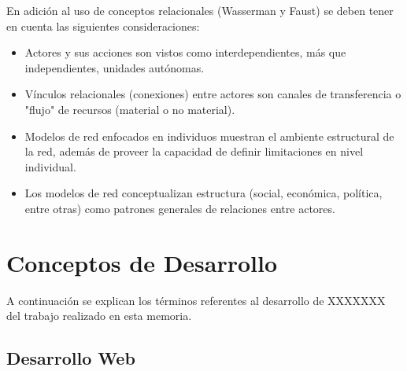 En adición al uso de conceptos relacionales (Wasserman y Faust\cite{sna}) se deben tener en cuenta las siguientes consideraciones:

  \begin{itemize}
    \item Actores y sus acciones son vistos como interdependientes, más que independientes, unidades autónomas.
    \item Vínculos relacionales (conexiones) entre actores son canales de transferencia o "flujo" de recursos (material o no material).
    \item Modelos de red enfocados en individuos muestran el ambiente estructural de la red, además de proveer la capacidad de definir limitaciones en nivel individual.
    \item Los modelos de red conceptualizan estructura (social, económica, política, entre otras) como patrones generales de relaciones entre actores.
  \end{itemize}


% 
% 
% 


\section{Conceptos de Desarrollo} %
\label{sec:conceptos_de_desarrollo}

A continuación se explican los términos referentes al desarrollo de XXXXXXX del trabajo realizado en esta memoria.

\subsection{Desarrollo Web} %
\label{sub:desarrollo_web}


